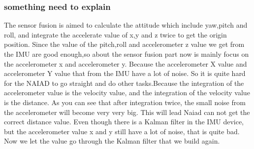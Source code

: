 		\subsubsection*{something need to explain}
		\noindent
		The sensor fusion is aimed to calculate the attitude which include yaw,pitch and roll, and integrate the accelerate value of x,y and z twice to get the origin position. Since the value of the pitch,roll and accelerometer z value we get from the IMU are good enough,so about the sensor fusion part now is mainly focus on the accelerometer x and accelerometer y.
		Because the accelerometer X value and accelerometer Y value that from the IMU have a lot of noise. So it is quite hard for the NAIAD to go straight and do other tasks.Because the integration of the accelerometer value is the velocity value, and the integration of the velocity value is the distance. As you can see that after integration twice, the small noise from the accelerometer will become very very big. This will lead Naiad can not get the correct distance value. Even though there is a Kalman filter in the IMU device, but the accelerometer value x and y still have a lot of noise, that is quite bad. Now we let the value go through the Kalman filter that we build again.
